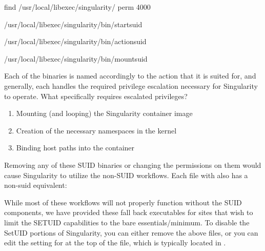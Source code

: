 \documentclass[letterpaper,10pt,english]{sphinxmanual}
\begin{document}
%
\begin{sphinxVerbatim}[commandchars=\\\{\}]
\PYGZdl{} find /usr/local/libexec/singularity/ \PYGZhy{}perm \PYGZhy{}4000

/usr/local/libexec/singularity/bin/start\PYGZhy{}suid

/usr/local/libexec/singularity/bin/action\PYGZhy{}suid

/usr/local/libexec/singularity/bin/mount\PYGZhy{}suid
\end{sphinxVerbatim}

Each of the binaries is named accordingly to the action that it is
suited for, and generally, each handles the required privilege
escalation necessary for Singularity to operate. What specifically
requires escalated privileges?
\begin{enumerate}
\item {} 
Mounting (and looping) the Singularity container image

\item {} 
Creation of the necessary namespaces in the kernel

\item {} 
Binding host paths into the container

\end{enumerate}

Removing any of these SUID binaries or changing the permissions on them
would cause Singularity to utilize the non-SUID workflows. Each file
with  also has a non-suid equivalent:

%
\begin{sphinxVerbatim}[commandchars=\\\{\}]


\end{sphinxVerbatim}

While most of these workflows will not properly function without the
SUID components, we have provided these fall back executables for
sites that wish to limit the SETUID capabilities to the bare
essentials/minimum. To disable the SetUID portions of Singularity, you
can either remove the above  files, or you can edit the setting for  at
the top of the  file, which is typically located in .
\end{document}
